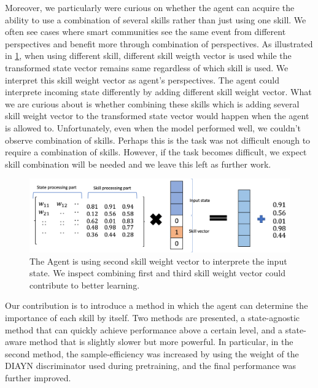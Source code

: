 Moreover, we particularly were curious on whether the agent can acquire the ability to use a combination of several skills rather than just using one skill.
We often see cases where smart communities see the same event from different perspectives and benefit more through combination of perspectives.
As illustrated in \cref*{fig:skill_as_perspective},
when using different skill, different skill weigth vector is used while the transformed state vector remains same regardless of which skill is used.
We interpret this skill weight vector as agent's perspectives. The agent could interprete incoming state differently by adding different skill weight vector.
What we are curious about is whether combining these skills which is adding several skill weight vector to the transformed state vector would happen when the agent is allowed to.
Unfortunately, even when the model performed well, we couldn't observe combination of skills.
Perhaps this is the task was not difficult enough to require a combination of skills.
However, if the task becomes difficult, we expect skill combination will be needed and we leave this left as further work.
\begin{figure}[ht]
  \vskip 0.2in
  \begin{center}
  \centerline{\includegraphics[width=\columnwidth]{Figures/state-skill-decomposition.png}}
  \caption{The Agent is using second skill weight vector to interprete the input state. We inspect combining first and third skill weight vector could contribute to better learning.}
  \label{fig:skill_as_perspective}
  \end{center}
  \vskip -0.2in
\end{figure}


Our contribution is to introduce a method in which the agent can determine the importance of each skill by itself.
Two methods are presented, a state-agnostic method that can quickly achieve performance above a certain level, and a state-aware method that is slightly slower but more powerful.
In particular, in the second method, the sample-efficiency was increased by using the weight of the DIAYN discriminator used during pretraining, and the final performance was further improved.
